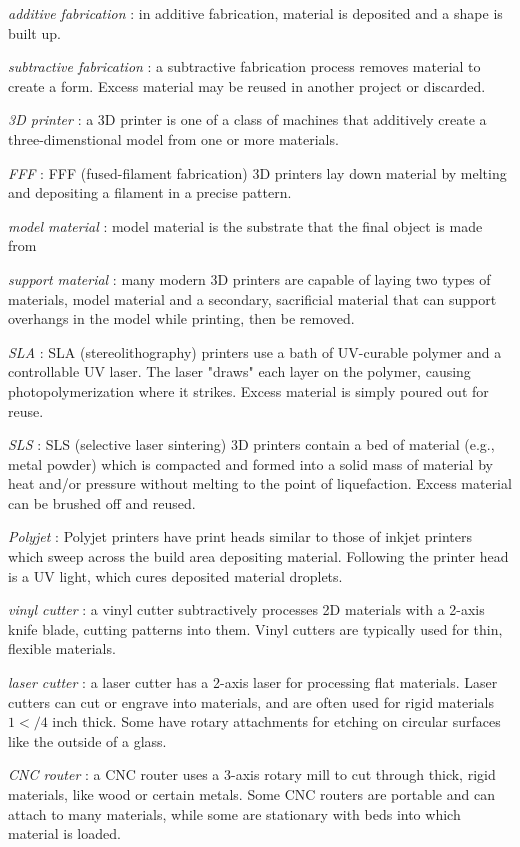 \emph{additive fabrication} : in additive fabrication, material is deposited and a shape is built up.

\emph{subtractive fabrication} : a subtractive fabrication process removes material to create a form. Excess material may be reused in another project or discarded.

\emph{3D printer} : a 3D printer is one of a class of machines that additively create a three-dimenstional model from one or more materials.

\emph{FFF} : FFF (fused-filament fabrication) 3D printers lay down material by melting and depositing a filament in a precise pattern.

\emph{model material} : model material is the substrate that the final object is made from

\emph{support material} : many modern 3D printers are capable of laying two types of materials, model material and a secondary, sacrificial material that can support overhangs in the model while printing, then be removed.

\emph{SLA} : SLA (stereolithography) printers use a bath of UV-curable polymer and a controllable UV laser. The laser "draws" each layer on the polymer, causing photopolymerization where it strikes. Excess material is simply poured out for reuse.

\emph{SLS} : SLS (selective laser sintering) 3D printers contain a bed of material (e.g., metal powder) which is compacted and formed into a solid mass of material by heat and/or pressure without melting to the point of liquefaction. Excess material can be brushed off and reused.

\emph{Polyjet} : Polyjet printers have print heads similar to those of inkjet printers which sweep across the build area depositing material. Following the printer head is a UV light, which cures deposited material droplets.

\emph{vinyl cutter} : a vinyl cutter subtractively processes 2D materials with a 2-axis knife blade, cutting patterns into them. Vinyl cutters are typically used for thin, flexible materials.

\emph{laser cutter} : a laser cutter has a 2-axis laser for processing flat materials. Laser cutters can cut or engrave into materials, and are often used for rigid materials $1</4$ inch thick. Some have rotary attachments for etching on circular surfaces like the outside of a glass.

\emph{CNC router} : a CNC router uses a 3-axis rotary mill to cut through thick, rigid materials, like wood or certain metals. Some CNC routers are portable and can attach to many materials, while some are stationary with beds into which material is loaded.


